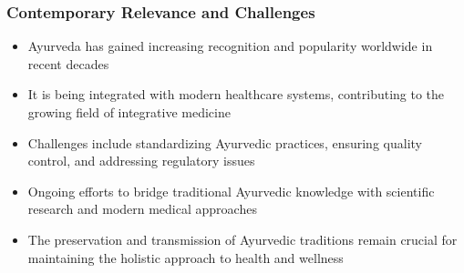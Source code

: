 \begin{frame}[fragile]\frametitle{Contemporary Relevance and Challenges}
    \begin{itemize}
        \item Ayurveda has gained increasing recognition and popularity worldwide in recent decades
        \item It is being integrated with modern healthcare systems, contributing to the growing field of integrative medicine
        \item Challenges include standardizing Ayurvedic practices, ensuring quality control, and addressing regulatory issues
        \item Ongoing efforts to bridge traditional Ayurvedic knowledge with scientific research and modern medical approaches
        \item The preservation and transmission of Ayurvedic traditions remain crucial for maintaining the holistic approach to health and wellness
    \end{itemize}
\end{frame}


